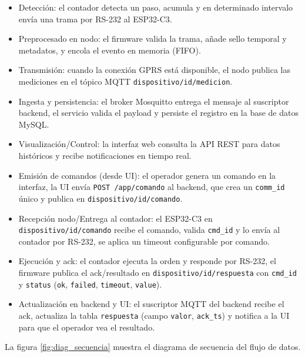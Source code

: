 \begin{itemize}

  \item Detección: el contador detecta un paso, acumula y en determinado intervalo envía una trama por RS-232 al ESP32-C3.

  \item Preprocesado en nodo: el firmware valida la trama, añade sello temporal y metadatos, y encola el evento en memoria (FIFO).

  \item Transmisión: cuando la conexión GPRS está disponible, el nodo publica las mediciones en el tópico MQTT \texttt{dispositivo/{id}/medicion}.
  
  \item Ingesta y persistencia: el broker Mosquitto entrega el mensaje al suscriptor backend, el servicio valida el payload y persiste el registro en la base de datos MySQL.
  
  \item Visualización/Control: la interfaz web consulta la API REST para datos históricos y recibe notificaciones en tiempo real.
  
  \item Emisión de comandos (desde UI): el operador genera un comando en la interfaz, la UI envía
  \texttt{POST /app/comando} al backend, que crea un \texttt{comm\_id} único y publica en \texttt{dispositivo/{id}/comando}.
  
  \item Recepción nodo/Entrega al contador: el ESP32-C3 en \\ \texttt{dispositivo/{id}/comando} recibe el comando, valida \texttt{cmd\_id} y lo envía al contador por RS-232, se aplica un timeout configurable por comando.
  
  \item Ejecución y ack: el contador ejecuta la orden y responde por RS-232, el firmware publica el ack/resultado en \texttt{dispositivo/{id}/respuesta} con \texttt{cmd\_id} y \texttt{status} (\texttt{ok}, \texttt{failed}, \texttt{timeout}, \texttt{value}).

  \item Actualización en backend y UI: el suscriptor MQTT del backend recibe el ack, actualiza la tabla \texttt{respuesta} (campo \texttt{valor}, \texttt{ack\_ts}) y notifica a la UI para que el operador vea el resultado.
\end{itemize}
\pagebreak

La figura \ref{fig:diag_secuencia} muestra el diagrama de secuencia del flujo de datos.

